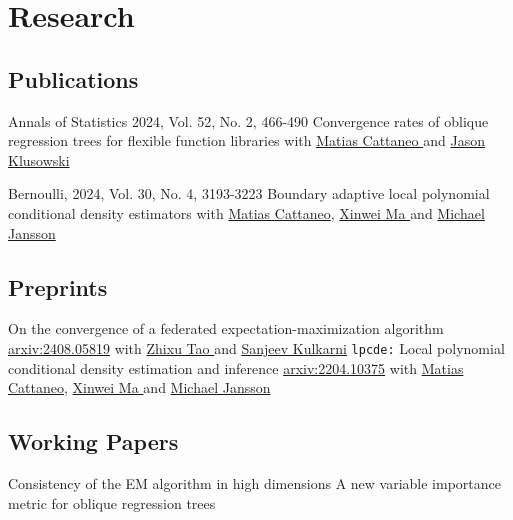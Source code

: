 \documentclass[10pt,a4paper,roman]{moderncv}        %
\begin{document}
\vspace{-0.3cm}
\section{Research}
\subsection{Publications}
\cventry{}
{Annals of Statistics 2024, Vol. 52, No. 2, 466-490}
{Convergence rates of oblique regression trees for flexible function libraries}
{}
{}
{with
  \color{blue}\href{https://cattaneo.princeton.edu}{Matias Cattaneo }\color{black} and
  \color{blue}\href{https://klusowski.princeton.edu}{Jason Klusowski}}

\cventry{}
{Bernoulli, 2024, Vol. 30, No. 4, 3193-3223}
{Boundary adaptive local polynomial conditional density estimators}
{}
{}
{with \color{blue}\href{https://cattaneo.princeton.edu}{Matias Cattaneo}\color{black},
  \color{blue}\href{https://sites.google.com/view/xinweima/home?authuser=0}{Xinwei
    Ma }\color{black}
  and
  \color{blue}\href{https://sites.google.com/berkeley.edu/michael-jansson/}{Michael
    Jansson}\color{black}
}

\subsection{Preprints}
{\vspace{-0.4cm}}
{On the convergence of a federated expectation-maximization algorithm}
{\color{blue}\href{https://arxiv.org/abs/2408.05819}{arxiv:2408.05819}\color{black}}
{}
{with
  \color{blue}\href{https://www.linkedin.com/in/zhixu-tao-a02b77199/}{Zhixu Tao }\color{black} and
  \color{blue}\href{https://www.princeton.edu/~kulkarni/}{Sanjeev Kulkarni}
}
{\vspace{-0.4cm}}
{\texttt{lpcde:} Local polynomial conditional density estimation and inference}
{\color{blue}\href{https://arxiv.org/abs/2204.10375}{arxiv:2204.10375}\color{black}}
{}
{with \color{blue}\href{https://cattaneo.princeton.edu}{Matias Cattaneo}\color{black},
  \color{blue}\href{https://sites.google.com/view/xinweima/home?authuser=0}{Xinwei
    Ma }\color{black}
  and
  \color{blue}\href{https://sites.google.com/berkeley.edu/michael-jansson/}{Michael
    Jansson}\color{black}
}
\subsection{Working Papers}
{Consistency of the EM algorithm in high dimensions} {}{}{}
\cventry{}{\vspace{-0.4cm}}
{A new variable importance metric for oblique regression trees} {}{}{}
\end{document}
